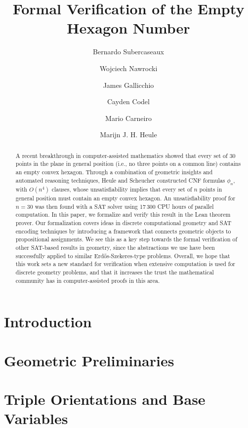 \documentclass[a4paper, USenglish, cleveref, autoref, thm-restate]{lipics-v2021}
\title{\texorpdfstring{Formal Verification of the Empty Hexagon Number}{A Formal Verification of the Empty Hexagon Number}}%
\author{Bernardo {Subercaseaux}}{Carnegie Mellon University}{bsuberca@andrew.cmu.edu}{https://orcid.org/0000-0003-2295-1299}{}
\author{Wojciech {Nawrocki}}{Carnegie Mellon University}{wjnawrocki@cmu.edu}{https://orcid.org/0000-0002-8839-0618}{}
\author{James {Gallicchio}}{Carnegie Mellon University}{jgallicc@andrew.cmu.edu}{https://orcid.org/0000-0002-0838-3240}{}
\author{Cayden {Codel}}{Carnegie Mellon University}{ccodel@andrew.cmu.edu}{https://orcid.org/0000-0003-3588-4873}{}
\author{Mario {Carneiro}}{Carnegie Mellon University}{mcarneir@andrew.cmu.edu}{https://orcid.org/0000-0002-0470-5249}{}
\author{Marijn J. H. {Heule}}{Carnegie Mellon University}{mheule@andrew.cmu.edu}{https://orcid.org/0000-0002-5587-8801}{}
\begin{document}
\maketitle

\begin{abstract}
  A recent breakthrough in computer-assisted mathematics showed that every set of $30$ points in the plane in general position (i.e., no three points on a common line) contains an empty convex hexagon. %
  Through a combination of geometric insights and automated reasoning techniques, Heule and Scheucher constructed CNF formulas $\phi_n$, with $O(n^4)$ clauses, whose unsatisfiability implies that every set of $n$ points in general position must contain an empty convex hexagon.
  An unsatisfiability proof for $n = 30$ was then found with a SAT solver using 17\,300 CPU hours of parallel computation. %
  In this paper, we formalize and verify this result in the Lean theorem prover. Our formalization covers ideas in discrete computational geometry and SAT encoding techniques by introducing a framework that connects geometric objects to propositional assignments.
  We see this as a key step towards the formal verification of other SAT-based results in geometry, since the abstractions we use have been successfully applied to similar Erd\H{o}s-Szekeres-type problems.
  Overall, we hope that this work sets a new standard for verification when extensive computation is used for discrete geometry problems, and that it increases the trust the mathematical community has in computer-assisted proofs in this area.
\end{abstract}


\section{Introduction}\label{sec:intro}


\newpage

\section{Geometric Preliminaries}\label{sec:geometry}


\section{Triple Orientations and Base Variables}\label{sec:triple-orientations}

\end{document}
